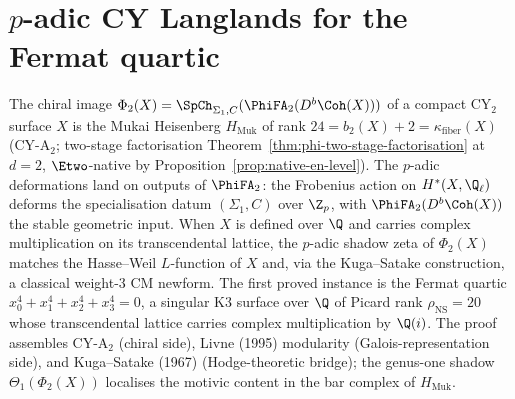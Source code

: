 \chapter{\texorpdfstring{$p$}{p}-adic CY Langlands for the Fermat quartic}
\label{ch:padic-langlands-cy}

The chiral image $\Phi_2(X) = \SpCh_{\Sigma_1, C}(\PhiFA_2(D^b\Coh(X)))$ of a compact CY$_2$ surface $X$ is the Mukai Heisenberg $H_{\mathrm{Muk}}$ of rank $24 = b_2(X) + 2 = \kappa_{\mathrm{fiber}}(X)$ (CY-A$_2$; two-stage factorisation Theorem~\ref{thm:phi-two-stage-factorisation} at $d = 2$, $\Etwo$-native by Proposition~\ref{prop:native-en-level}). The $p$-adic deformations land on outputs of $\PhiFA_2$: the Frobenius action on $H^\ast(X, \Q_\ell)$ deforms the specialisation datum $(\Sigma_1, C)$ over $\Z_p$, with $\PhiFA_2(D^b\Coh(X))$ the stable geometric input. When $X$ is defined over $\Q$ and carries complex multiplication on its transcendental lattice, the $p$-adic shadow zeta of $\Phi_2(X)$ matches the Hasse--Weil $L$-function of $X$ and, via the Kuga--Satake construction, a classical weight-$3$ CM newform. The first proved instance is the Fermat quartic $x_0^4 + x_1^4 + x_2^4 + x_3^4 = 0$, a singular K3 surface over $\Q$ of Picard rank $\rho_{\mathrm{NS}} = 20$ whose transcendental lattice carries complex multiplication by $\Q(i)$. The proof assembles CY-A$_2$ (chiral side), Livne (1995) modularity (Galois-representation side), and Kuga--Satake (1967) (Hodge-theoretic bridge); the genus-one shadow $\Theta_1(\Phi_2(X))$ localises the motivic content in the bar complex of $H_{\mathrm{Muk}}$.

